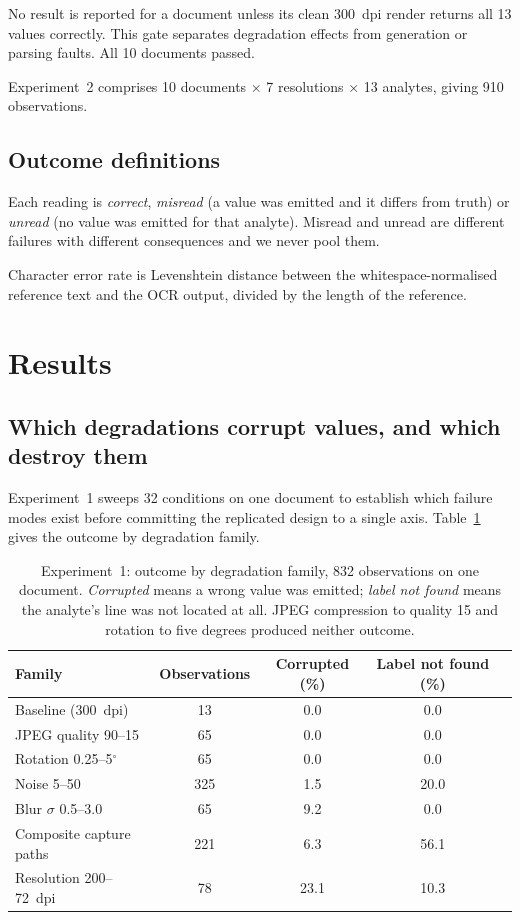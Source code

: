 \documentclass[11pt]{article}
\begin{document}
No result is reported for a document unless its clean 300~dpi render returns all 13 values
correctly. This gate separates degradation effects from generation or parsing faults. All 10
documents passed.

Experiment~2 comprises 10 documents $\times$ 7 resolutions $\times$ 13 analytes, giving 910
observations.

\subsection{Outcome definitions}

Each reading is \emph{correct}, \emph{misread} (a value was emitted and it differs from truth)
or \emph{unread} (no value was emitted for that analyte). Misread and unread are different
failures with different consequences and we never pool them.

Character error rate is Levenshtein distance between the whitespace-normalised reference text
and the OCR output, divided by the length of the reference.

\section{Results}

\subsection{Which degradations corrupt values, and which destroy them}

Experiment~1 sweeps 32 conditions on one document to establish which failure modes exist before
committing the replicated design to a single axis. Table~\ref{tab:families} gives the outcome by
degradation family.

\begin{table}[t]
\centering
\caption{Experiment~1: outcome by degradation family, 832 observations on one document.
\emph{Corrupted} means a wrong value was emitted; \emph{label not found} means the analyte's line
was not located at all. JPEG compression to quality 15 and rotation to five degrees produced
neither outcome.}
\label{tab:families}
\small
\begin{tabular}{lcccc}
\toprule
Family & Observations & Corrupted (\%) & Label not found (\%) \\
\midrule
Baseline (300~dpi) & 13  & \phantom{0}0.0 & \phantom{0}0.0 \\
JPEG quality 90--15 & 65  & \phantom{0}0.0 & \phantom{0}0.0 \\
Rotation 0.25--5$^\circ$ & 65  & \phantom{0}0.0 & \phantom{0}0.0 \\
Noise 5--50 & 325 & \phantom{0}1.5 & 20.0 \\
Blur $\sigma$ 0.5--3.0 & 65  & \phantom{0}9.2 & \phantom{0}0.0 \\
Composite capture paths & 221 & \phantom{0}6.3 & 56.1 \\
Resolution 200--72~dpi & 78  & 23.1 & 10.3 \\
\bottomrule
\end{tabular}
\end{table}
\end{document}
